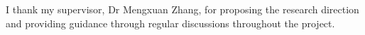 I thank my supervisor, Dr Mengxuan Zhang, for proposing the research
direction and providing guidance through regular discussions throughout
the project.
